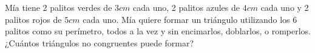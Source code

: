 Mía tiene 2 palitos verdes de $3cm$ cada uno, 2 palitos azules de $4cm$ cada uno y 2 palitos rojos de $5cm$ cada uno. Mía quiere formar un triángulo utilizando los 6 palitos como su perímetro, todos a la vez y sin encimarlos, doblarlos, o romperlos. ¿Cuántos triángulos no congruentes puede formar?